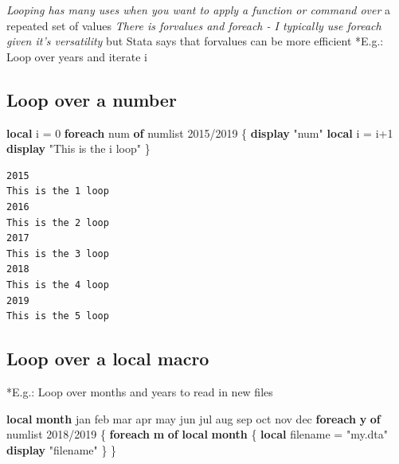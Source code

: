 \documentclass[
]{book}
\newenvironment{Shaded}{\begin{snugshade}}{\end{snugshade}}
\newcommand{\FunctionTok}[1]{\textcolor[rgb]{0.13,0.29,0.53}{\textbf{#1}}}
\newcommand{\KeywordTok}[1]{\textcolor[rgb]{0.13,0.29,0.53}{\textbf{#1}}}
\newcommand{\NormalTok}[1]{#1}
\newcommand{\OtherTok}[1]{\textcolor[rgb]{0.56,0.35,0.01}{#1}}
\newcommand{\StringTok}[1]{\textcolor[rgb]{0.31,0.60,0.02}{#1}}
\begin{document}
\emph{Looping has many uses when you want to apply a function or command over
}a repeated set of values
\emph{There is forvalues and foreach - I typically use foreach given it's versatility
}but Stata says that forvalues can be more efficient
*E.g.: Loop over years and iterate i

\subsection{Loop over a number}\label{loop-over-a-number}

\begin{Shaded}
\begin{Highlighting}[]
\KeywordTok{local}\NormalTok{ i = 0}
\KeywordTok{foreach}\NormalTok{ num }\KeywordTok{of}\NormalTok{ numlist 2015/2019 \{}
  \KeywordTok{display} \StringTok{"\textasciigrave{}num\textquotesingle{}"}
  \KeywordTok{local}\NormalTok{ i = }\OtherTok{\textasciigrave{}i\textquotesingle{}}\NormalTok{+1}
  \KeywordTok{display} \StringTok{"This is the \textasciigrave{}i\textquotesingle{} loop"}
\NormalTok{\}}
\end{Highlighting}
\end{Shaded}

\begin{verbatim}
2015
This is the 1 loop
2016
This is the 2 loop
2017
This is the 3 loop
2018
This is the 4 loop
2019
This is the 5 loop
\end{verbatim}

\subsection{Loop over a local macro}\label{loop-over-a-local-macro}

*E.g.: Loop over months and years to read in new files

\begin{Shaded}
\begin{Highlighting}[]
\KeywordTok{local} \FunctionTok{month}\NormalTok{ jan feb mar apr may jun jul aug sep oct nov dec}
\KeywordTok{foreach} \FunctionTok{y} \KeywordTok{of}\NormalTok{ numlist 2018/2019 \{}
  \KeywordTok{foreach} \FunctionTok{m} \KeywordTok{of} \KeywordTok{local} \FunctionTok{month}\NormalTok{ \{}
    \KeywordTok{local}\NormalTok{ filename = }\StringTok{"\textasciigrave{}m\textquotesingle{}\textasciigrave{}y\textquotesingle{}.dta"}
    \KeywordTok{display} \StringTok{"\textasciigrave{}filename\textquotesingle{}"}
\NormalTok{  \}}
\NormalTok{\}}
\end{Highlighting}
\end{Shaded}
\end{document}
